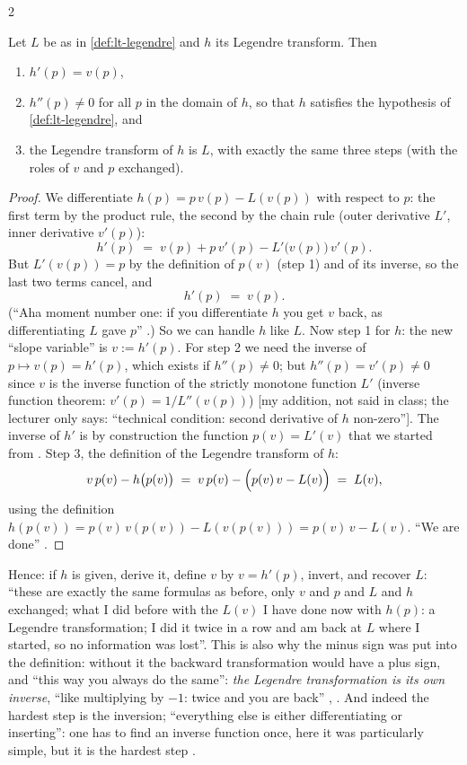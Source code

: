 \begin{paracol}{2}
\begin{theorem}\label{thm:lt-involution}
Let $L$ be as in \cref{def:lt-legendre} and $h$ its Legendre transform. Then
\begin{enumerate}
  \item $h'(p)=v(p)$, \label{it:lt-hprime}
  \item $h''(p)\neq0$ for all $p$ in the domain of $h$, so that $h$ satisfies the hypothesis of \cref{def:lt-legendre}, and
  \item the Legendre transform of $h$ is $L$, with exactly the same three steps (with the roles of $v$ and $p$ exchanged).
\end{enumerate}
\end{theorem}
\begin{proof}
We differentiate $h(p)=p\,v(p)-L(v(p))$ with respect to $p$: the first term by the product rule, the second by the chain rule (outer derivative $L'$, inner derivative $v'(p)$):
\[
  h'(p)\;=\;v(p)+p\,v'(p)-L'\bigl(v(p)\bigr)\,v'(p).
\]
But $L'(v(p))=p$ by the definition of $p(v)$ (step 1) and of its inverse, so the last two terms cancel, and
\[
  h'(p)\;=\;v(p).
\]
(``Aha moment number one: if you differentiate $h$ you get $v$ back, as differentiating $L$ gave $p$'' .)
So we can handle $h$ like $L$. Now step 1 for $h$: the new ``slope variable'' is $v:=h'(p)$. For step 2 we need the inverse of $p\mapsto v(p)=h'(p)$, which exists if $h''(p)\neq0$; but $h''(p)=v'(p)\neq0$ since $v$ is the inverse function of the strictly monotone function $L'$ (inverse function theorem: $v'(p)=1/L''(v(p))$) [my addition, not said in class; the lecturer only says: ``technical condition: second derivative of $h$ non-zero'']. The inverse of $h'$ is by construction the function $p(v)=L'(v)$ that we started from . Step 3, the definition of the Legendre transform of $h$:
\[
  v\,p(v)-h\bigl(p(v)\bigr)\;=\;v\,p(v)-\Bigl(p(v)\,v-L(v)\Bigr)\;=\;L(v),
\]
using the definition $h(p(v))=p(v)\,v(p(v))-L(v(p(v)))=p(v)\,v-L(v)$. ``We are done'' .
\end{proof}
Hence: if $h$ is given, derive it, define $v$ by $v=h'(p)$, invert, and recover $L$: ``these are exactly the same formulas as before, only $v$ and $p$ and $L$ and $h$ exchanged; what I did before with the $L(v)$ I have done now with $h(p)$: a Legendre transformation; I did it twice in a row and am back at $L$ where I started, so no information was lost''. This is also why the minus sign was put into the definition: without it the backward transformation would have a plus sign, and ``this way you always do the same'': \emph{the Legendre transformation is its own inverse}, ``like multiplying by $-1$: twice and you are back'' , . And indeed the hardest step is the inversion; ``everything else is either differentiating or inserting'': one has to find an inverse function once, here it was particularly simple, but it is the hardest step .


\end{paracol}
